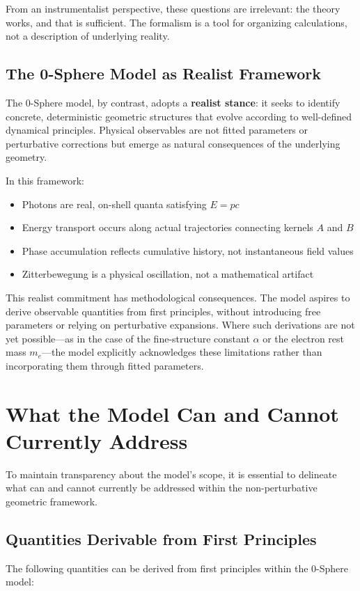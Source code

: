 \documentclass[12pt,letterpaper]{article}
\begin{document}
From an instrumentalist perspective, these questions are irrelevant: the theory works, and that is sufficient. The formalism is a tool for organizing calculations, not a description of underlying reality.

\subsection{The 0-Sphere Model as Realist Framework}

The 0-Sphere model, by contrast, adopts a \textbf{realist stance}: it seeks to identify concrete, deterministic geometric structures that evolve according to well-defined dynamical principles. Physical observables are not fitted parameters or perturbative corrections but emerge as natural consequences of the underlying geometry.

In this framework:
\begin{itemize}
\item Photons are real, on-shell quanta satisfying $E = pc$
\item Energy transport occurs along actual trajectories connecting kernels $A$ and $B$
\item Phase accumulation reflects cumulative history, not instantaneous field values
\item Zitterbewegung is a physical oscillation, not a mathematical artifact
\end{itemize}

This realist commitment has methodological consequences. The model aspires to derive observable quantities from first principles, without introducing free parameters or relying on perturbative expansions. Where such derivations are not yet possible—as in the case of the fine-structure constant $\alpha$ or the electron rest mass $m_e$—the model explicitly acknowledges these limitations rather than incorporating them through fitted parameters.


\section{What the Model Can and Cannot Currently Address}
\label{sec:scope}

To maintain transparency about the model's scope, it is essential to delineate what can and cannot currently be addressed within the non-perturbative geometric framework.

\subsection{Quantities Derivable from First Principles}
The following quantities can be derived from first principles within the 0-Sphere model:
\end{document}
